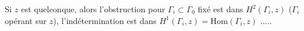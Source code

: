 Si $z$ est quelconque, alors l’obstruction pour $\Gamma_i\subset\Gamma_0$ fixé est dans $H^2(\Gamma_i,z)$ ($\Gamma_i$ opérant  sur $z$), l’indétermination est dans $H^1(\Gamma_i,z)=\mathrm{Hom}(\Gamma_i,z)$ .....
